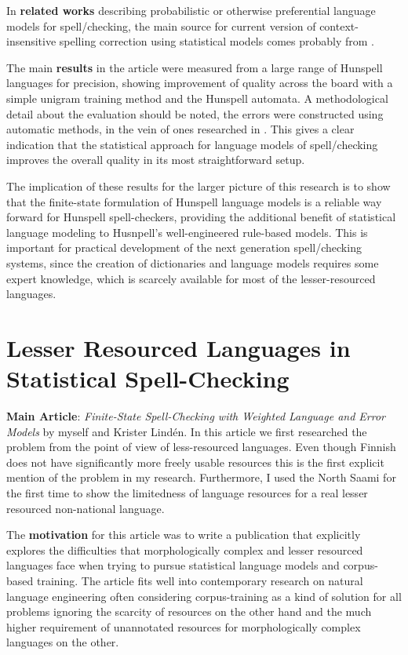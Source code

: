 \documentclass[officiallayout]{unihelcompling}
\begin{document}
In \textbf{related works} describing probabilistic or otherwise preferential
language models for spell\-/checking, the main source for current version of 
context-insensitive spelling correction using statistical models comes
probably from \citet{church1991probability}.

The main \textbf{results} in the article were measured from a large range of
Hunspell languages for precision, showing improvement of quality across the
board with a simple unigram training method and the Hunspell automata. A
methodological detail about the evaluation should be noted, the errors were
constructed using automatic methods, in the vein of ones researched in
\citep{bigert2003autoeval,bigert2005automatic}. This gives a clear indication
that the statistical approach for language models of spell\-/checking improves
the overall quality in its most straightforward setup.

The implication of these results for the larger picture of this research is to
show that the finite-state formulation of Hunspell language models is a
reliable way forward for Hunspell spell-checkers, providing the additional
benefit of statistical language modeling to Husnpell's well-engineered
rule-based models. This is important for practical development of the next
generation spell\-/checking systems, since the creation of dictionaries and
language models requires some expert knowledge, which is scarcely available for
most of the lesser-resourced languages.

\section{Lesser Resourced Languages in Statistical Spell-Checking}
\label{sec:lesser-training}

\textbf{Main Article}: \emph{Finite-State Spell-Checking with Weighted Language
and Error Models} by myself and Krister Lindén. In this article we first
researched the problem from the point of view of less-resourced languages. Even
though Finnish does not have significantly more freely usable resources this
is the first explicit mention of the problem in my research. Furthermore, I
used the North Saami for the first time to show the limitedness of language
resources for a real lesser resourced non-national language.

The \textbf{motivation} for this article was to write a publication that
explicitly explores the difficulties that morphologically complex and lesser
resourced languages face when trying to pursue statistical language models and
corpus-based training. The article fits well into contemporary research on
natural language engineering often considering corpus-training as a kind of
solution for all problems ignoring the scarcity of resources on the other hand
and the much higher requirement of unannotated resources for morphologically
complex languages on the other.
\end{document}

